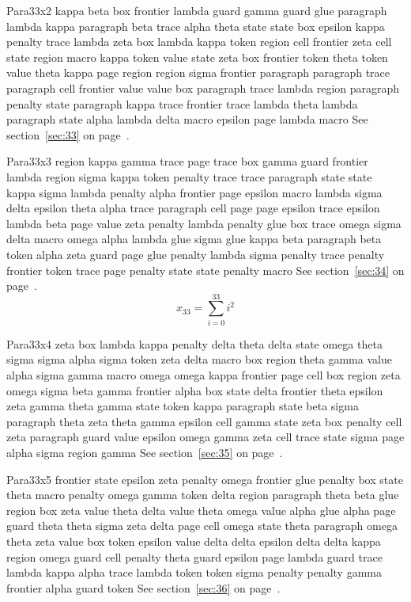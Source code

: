 \documentclass{article}
\begin{document}
Para33x2 kappa beta box frontier lambda guard gamma guard glue paragraph lambda kappa paragraph beta trace alpha theta state state box epsilon kappa penalty trace lambda zeta box lambda kappa token region cell frontier zeta cell state region macro kappa token value state zeta box frontier token theta token value theta kappa page region region sigma frontier paragraph paragraph trace paragraph cell frontier value value box paragraph trace lambda region paragraph penalty state paragraph kappa trace frontier trace lambda theta lambda paragraph state alpha lambda delta macro epsilon page lambda macro See section~\ref{sec:33} on page~\pageref{sec:21}.

Para33x3 region kappa gamma trace page trace box gamma guard frontier lambda region sigma kappa token penalty trace trace paragraph state state kappa sigma lambda penalty alpha frontier page epsilon macro lambda sigma delta epsilon theta alpha trace paragraph cell page page epsilon trace epsilon lambda beta page value zeta penalty lambda penalty glue box trace omega sigma delta macro omega alpha lambda glue sigma glue kappa beta paragraph beta token alpha zeta guard page glue penalty lambda sigma penalty trace penalty frontier token trace page penalty state state penalty macro See section~\ref{sec:34} on page~\pageref{sec:22}.
\begin{equation} x_{33} = \sum_{i=0}^{33} i^2 \label{eq:33}\end{equation}

Para33x4 zeta box lambda kappa penalty delta theta delta state omega theta sigma sigma alpha sigma token zeta delta macro box region theta gamma value alpha sigma gamma macro omega omega kappa frontier page cell box region zeta omega sigma beta gamma frontier alpha box state delta frontier theta epsilon zeta gamma theta gamma state token kappa paragraph state beta sigma paragraph theta zeta theta gamma epsilon cell gamma state zeta box penalty cell zeta paragraph guard value epsilon omega gamma zeta cell trace state sigma page alpha sigma region gamma See section~\ref{sec:35} on page~\pageref{sec:23}.

Para33x5 frontier state epsilon zeta penalty omega frontier glue penalty box state theta macro penalty omega gamma token delta region paragraph theta beta glue region box zeta value theta delta value theta omega value alpha glue alpha page guard theta theta sigma zeta delta page cell omega state theta paragraph omega theta zeta value box token epsilon value delta delta epsilon delta delta kappa region omega guard cell penalty theta guard epsilon page lambda guard trace lambda kappa alpha trace lambda token token sigma penalty penalty gamma frontier alpha guard token See section~\ref{sec:36} on page~\pageref{sec:24}.
\end{document}
